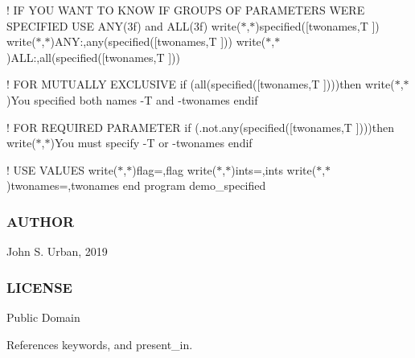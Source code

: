! IF Y\+OU W\+A\+NT TO K\+N\+OW IF G\+R\+O\+U\+PS OF P\+A\+R\+A\+M\+E\+T\+E\+RS W\+E\+RE S\+P\+E\+C\+I\+F\+I\+ED U\+SE A\+N\+Y(3f) and A\+L\+L(3f) write($\ast$,$\ast$)specified(\mbox{[}\textquotesingle{}twonames\textquotesingle{},\textquotesingle{}T \textquotesingle{}\mbox{]}) write($\ast$,$\ast$)\textquotesingle{}A\+NY\+:\textquotesingle{},any(specified(\mbox{[}\textquotesingle{}twonames\textquotesingle{},\textquotesingle{}T \textquotesingle{}\mbox{]})) write($\ast$,$\ast$)\textquotesingle{}A\+LL\+:\textquotesingle{},all(specified(\mbox{[}\textquotesingle{}twonames\textquotesingle{},\textquotesingle{}T \textquotesingle{}\mbox{]}))

! F\+OR M\+U\+T\+U\+A\+L\+LY E\+X\+C\+L\+U\+S\+I\+VE if (all(specified(\mbox{[}\textquotesingle{}twonames\textquotesingle{},\textquotesingle{}T \textquotesingle{}\mbox{]})))then write($\ast$,$\ast$)\textquotesingle{}You specified both names -\/T and -\/twonames\textquotesingle{} endif

! F\+OR R\+E\+Q\+U\+I\+R\+ED P\+A\+R\+A\+M\+E\+T\+ER if (.not.\+any(specified(\mbox{[}\textquotesingle{}twonames\textquotesingle{},\textquotesingle{}T \textquotesingle{}\mbox{]})))then write($\ast$,$\ast$)\textquotesingle{}You must specify -\/T or -\/twonames\textquotesingle{} endif

! U\+SE V\+A\+L\+U\+ES write($\ast$,$\ast$)\textquotesingle{}flag=\textquotesingle{},flag write($\ast$,$\ast$)\textquotesingle{}ints=\textquotesingle{},ints write($\ast$,$\ast$)\textquotesingle{}twonames=\textquotesingle{},twonames end program demo\+\_\+specified

\subsubsection*{A\+U\+T\+H\+OR}

John S. Urban, 2019 \subsubsection*{L\+I\+C\+E\+N\+SE}

Public Domain 

References keywords, and present\+\_\+in.

\mbox{\label{namespacem__cli2_a6578e29ee4dc56651528e7e0acd29665}} 
